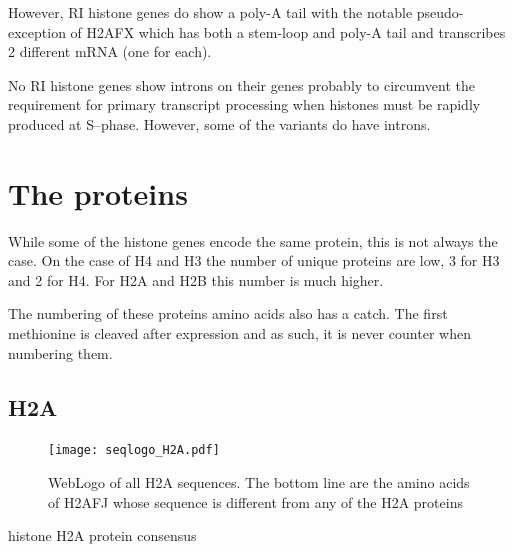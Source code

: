 \documentclass[10pt,a4paper,draft,article]{memoir}
\begin{document}
      However, RI histone genes do show a poly-A tail with the notable pseudo-exception of H2AFX which has both
      a stem-loop and poly-A tail and transcribes 2 different mRNA (one for each).

      No RI histone genes show introns on their genes probably to circumvent the requirement
      for primary transcript processing when histones must be rapidly produced at S--phase.
      However, some of the variants do have introns.

  \section{The proteins}
    While some of the histone genes encode the same protein, this is not always the case. On the case of H4 and H3  the number of unique proteins are low, 3 for H3 and 2 for H4. For H2A and H2B
    this number is much higher.

    The numbering of these proteins amino acids also has a catch. The first methionine is cleaved after expression and as such, it is
    never counter when numbering them.

    \subsection{H2A}
      \begin{figure}
        \centering
        \texttt{[image: seqlogo\_H2A.pdf]}
        \caption{WebLogo of all H2A sequences. The bottom line are the amino acids of H2AFJ whose sequence is different from any of the H2A proteins}
        \label{fig:h2a-weblogo}
      \end{figure}

      \begin{table}
        \centering
        
        \caption{histone H2A protein consensus}
        \label{tab:H2A-consensus}
      \end{table}

\end{document}
